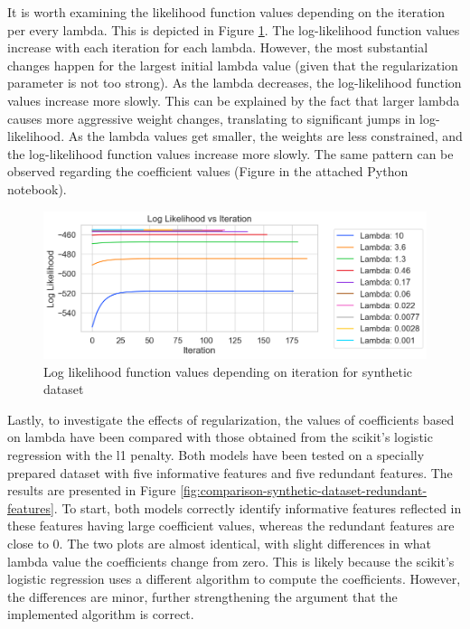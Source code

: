 \documentclass[11pt]{article}
\begin{document}
It is worth examining the likelihood function values depending on the iteration per every lambda. This is depicted in Figure \ref{fig:log-likelihood-synthetic-dataset}. The log-likelihood function values increase with each iteration for each lambda. However, the most substantial changes happen for the largest initial lambda value (given that the regularization parameter is not too strong). As the lambda decreases, the log-likelihood function values increase more slowly. This can be explained by the fact that larger lambda causes more aggressive weight changes, translating to significant jumps in log-likelihood. As the lambda values get smaller, the weights are less constrained, and the log-likelihood function values increase more slowly. The same pattern can be observed regarding the coefficient values (Figure in the attached Python notebook). \par 


\begin{figure}
    \centering
  \includegraphics[width=\textwidth]{../results/log_likelihood_synthetic_dataset.png}
    \caption{Log likelihood function values depending on iteration for synthetic dataset}
    \label{fig:log-likelihood-synthetic-dataset}
\end{figure}


Lastly, to investigate the effects of regularization, the values of coefficients based on lambda have been compared with those obtained from the scikit's logistic regression with the l1 penalty. Both models have been tested on a specially prepared dataset with five informative features and five redundant features. The results are presented in Figure \ref{fig:comparison-synthetic-dataset-redundant-features}. To start, both models correctly identify informative features reflected in these features having large coefficient values, whereas the redundant features are close to 0. The two plots are almost identical, with slight differences in what lambda value the coefficients change from zero. This is likely because the scikit's logistic regression uses a different algorithm to compute the coefficients. However, the differences are minor, further strengthening the argument that the implemented algorithm is correct. \par
\end{document}

